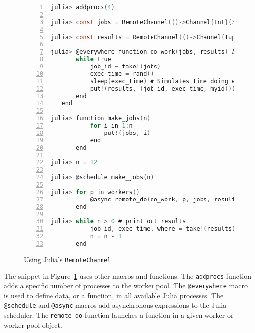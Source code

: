 \begin{figure}[htpb]
    \begin{minipage}{\linewidth}
    \begin{lstlisting}[language=C, basicstyle=\ttfamily\scriptsize,
        numbers=left,
        frame=no, showspaces=false, showstringspaces=false,
        numberstyle=\scriptsize,
        xleftmargin=1.5cm,
        keywords={%
            @spawnat, remotecall, Nullable, Any,
            fetch, Future, Array, Float64, julia,
            while, true, function, end, put!,
            take!, sleep, RemoteChannel, Channel,
            Int, Tuple, const, addprocs, @schedule,
            @everywhere, for, in, myid, @async,
            remote_do, workers%
        },
        otherkeywords={::, \&, \*, +, -, /, [, ], >, <, put!, take!}
    ]
julia> addprocs(4)

julia> const jobs = RemoteChannel(()->Channel{Int}(32))

julia> const results = RemoteChannel(()->Channel{Tuple}(32))

julia> @everywhere function do_work(jobs, results) # Defines method everywhere
       while true
           job_id = take!(jobs)
           exec_time = rand()
           sleep(exec_time) # Simulates time doing work
           put!(results, (job_id, exec_time, myid()))
       end
   end

julia> function make_jobs(n)
           for i in 1:n
               put!(jobs, i)
           end
       end

julia> n = 12

julia> @schedule make_jobs(n)

julia> for p in workers()
           @async remote_do(do_work, p, jobs, results)
       end

julia> while n > 0 # print out results
           job_id, exec_time, where = take!(results)
           n = n - 1
       end
    \end{lstlisting}
    \end{minipage}
    \caption{Using Julia's \texttt{RemoteChannel}}
    \label{fig:remotechannel_example}
\end{figure}

The snippet in Figure~\ref{fig:remotechannel_example} uses other macros and
functions. The \texttt{addprocs} function adds a specific number of processes
to the worker pool. The \texttt{@everywhere} macro is used to define data, or a
function, in all available Julia processes. The \texttt{@schedule} and
\texttt{@async} macros add asynchronous expressions to the Julia scheduler.
The \texttt{remote\_do} function launches a function in a given worker or
worker pool object.

